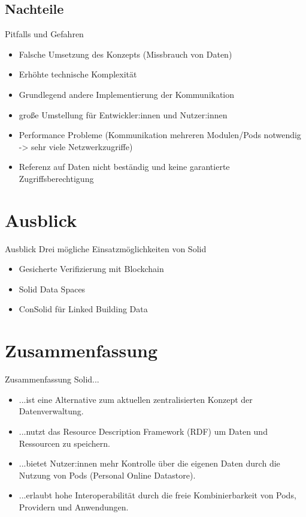 \documentclass{beamer}              %
\begin{document}
\subsection{Nachteile}
\begin{frame}{Pitfalls und Gefahren}
\begin{itemize}
    \item Falsche Umsetzung des Konzepts (Missbrauch von Daten) \cite{MarcoNeumann.2021}
    \item Erhöhte technische Komplexität \cite{MarcoNeumann.2021}
    \item Grundlegend andere Implementierung der Kommunikation \cite{MarcoNeumann.2021}
    \item große Umstellung für Entwickler:innen und Nutzer:innen \cite{MarcoNeumann.2021}
    \item Performance Probleme (Kommunikation mehreren Modulen/Pods notwendig -> sehr viele Netzwerkzugriffe) \cite{MarcoNeumann.2021}
    \item Referenz auf Daten nicht beständig und keine garantierte Zugriffsberechtigung

\end{itemize}
\end{frame}

\section{Ausblick}
\begin{frame}{Ausblick}
Drei mögliche Einsatzmöglichkeiten von Solid
\begin{itemize}
    \item Gesicherte Verifizierung mit Blockchain ~\cite{ramachandran2020towards}
    \item Solid Data Spaces  ~\cite{meckler2023web}
    \item ConSolid für Linked Building Data ~\cite{8633673}
\end{itemize}
\end{frame}

\section{Zusammenfassung}
\begin{frame}{Zusammenfassung}
Solid...
\begin{itemize}
    \item ...ist eine Alternative zum aktuellen zentralisierten Konzept der Datenverwaltung.
    \item ...nutzt das Resource Description Framework (RDF) um Daten und Ressourcen zu speichern.
    \item ...bietet Nutzer:innen mehr Kontrolle über die eigenen Daten durch die Nutzung von Pods (Personal Online Datastore).
    \item ...erlaubt hohe Interoperabilität durch die freie Kombinierbarkeit von Pods, Providern und Anwendungen.
\end{itemize}
\end{frame}
\end{document}
